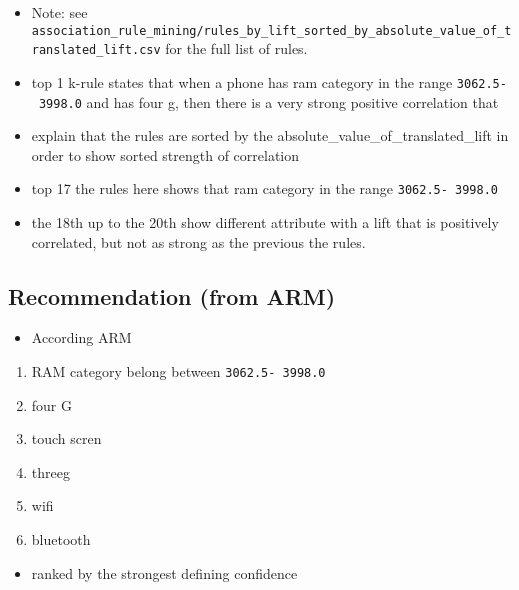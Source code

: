 \documentclass[11pt]{article}
\providecommand{\tightlist}{%
      \setlength{\itemsep}{0pt}\setlength{\parskip}{0pt}}
\begin{document}
\begin{itemize}
\item
  Note: see
  \texttt{association\_rule\_mining/rules\_by\_lift\_sorted\_by\_absolute\_value\_of\_translated\_lift.csv}
  for the full list of rules.
\item
  top 1 k-rule states that when a phone has ram category in the range
  \texttt{3062.5-\ 3998.0} and has four g, then there is a very strong
  positive correlation that
\item
  explain that the rules are sorted by the
  absolute\_value\_of\_translated\_lift in order to show sorted strength
  of correlation
\item
  top 17 the rules here shows that ram category in the range
  \texttt{3062.5-\ 3998.0}
\end{itemize}

    \begin{itemize}
\tightlist
\item
  the 18th up to the 20th show different attribute with a lift that is
  positively correlated, but not as strong as the previous the rules.
\end{itemize}

    \hypertarget{recommendation-from-arm}{%
\subsection{Recommendation (from ARM)}\label{recommendation-from-arm}}

\begin{itemize}
\tightlist
\item
  According ARM
\end{itemize}

\begin{enumerate}
\def\labelenumi{\arabic{enumi}.}
\tightlist
\item
  RAM category belong between \texttt{3062.5-\ 3998.0}
\item
  four G
\item
  touch scren
\item
  threeg
\item
  wifi
\item
  bluetooth
\end{enumerate}

\begin{itemize}
\tightlist
\item
  ranked by the strongest defining confidence
\end{itemize}
\end{document}
